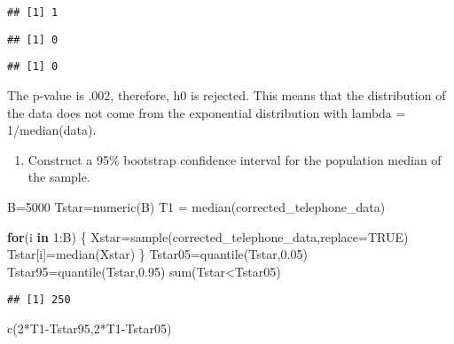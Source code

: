 \documentclass[
]{article}
\newenvironment{Shaded}{\begin{snugshade}}{\end{snugshade}}
\newcommand{\AttributeTok}[1]{\textcolor[rgb]{0.77,0.63,0.00}{#1}}
\newcommand{\ConstantTok}[1]{\textcolor[rgb]{0.00,0.00,0.00}{#1}}
\newcommand{\ControlFlowTok}[1]{\textcolor[rgb]{0.13,0.29,0.53}{\textbf{#1}}}
\newcommand{\DecValTok}[1]{\textcolor[rgb]{0.00,0.00,0.81}{#1}}
\newcommand{\FloatTok}[1]{\textcolor[rgb]{0.00,0.00,0.81}{#1}}
\newcommand{\FunctionTok}[1]{\textcolor[rgb]{0.00,0.00,0.00}{#1}}
\newcommand{\NormalTok}[1]{#1}
\newcommand{\OtherTok}[1]{\textcolor[rgb]{0.56,0.35,0.01}{#1}}
\newcommand{\SpecialCharTok}[1]{\textcolor[rgb]{0.00,0.00,0.00}{#1}}
\providecommand{\tightlist}{%
  \setlength{\itemsep}{0pt}\setlength{\parskip}{0pt}}
\begin{document}
\begin{verbatim}
## [1] 1
\end{verbatim}

\begin{verbatim}
## [1] 0
\end{verbatim}

\begin{verbatim}
## [1] 0
\end{verbatim}

The p-value is .002, therefore, h0 is rejected. This means that the
distribution of the data does not come from the exponential distribution
with lambda = 1/median(data).

\begin{enumerate}
\def\labelenumi{\alph{enumi})}
\setcounter{enumi}{2}
\tightlist
\item
  Construct a 95\% bootstrap confidence interval for the population
  median of the sample.
\end{enumerate}

\begin{Shaded}
\begin{Highlighting}[]
\NormalTok{B}\OtherTok{=}\DecValTok{5000}
\NormalTok{Tstar}\OtherTok{=}\FunctionTok{numeric}\NormalTok{(B)}
\NormalTok{T1 }\OtherTok{=} \FunctionTok{median}\NormalTok{(corrected\_telephone\_data)}

\ControlFlowTok{for}\NormalTok{(i }\ControlFlowTok{in} \DecValTok{1}\SpecialCharTok{:}\NormalTok{B) \{}
\NormalTok{  Xstar}\OtherTok{=}\FunctionTok{sample}\NormalTok{(corrected\_telephone\_data,}\AttributeTok{replace=}\ConstantTok{TRUE}\NormalTok{)}
\NormalTok{  Tstar[i]}\OtherTok{=}\FunctionTok{median}\NormalTok{(Xstar) \}}
\NormalTok{  Tstar05}\OtherTok{=}\FunctionTok{quantile}\NormalTok{(Tstar,}\FloatTok{0.05}\NormalTok{)}
\NormalTok{  Tstar95}\OtherTok{=}\FunctionTok{quantile}\NormalTok{(Tstar,}\FloatTok{0.95}\NormalTok{)}
  \FunctionTok{sum}\NormalTok{(Tstar}\SpecialCharTok{\textless{}}\NormalTok{Tstar05)}
\end{Highlighting}
\end{Shaded}

\begin{verbatim}
## [1] 250
\end{verbatim}

\begin{Shaded}
\begin{Highlighting}[]
\FunctionTok{c}\NormalTok{(}\DecValTok{2}\SpecialCharTok{*}\NormalTok{T1}\SpecialCharTok{{-}}\NormalTok{Tstar95,}\DecValTok{2}\SpecialCharTok{*}\NormalTok{T1}\SpecialCharTok{{-}}\NormalTok{Tstar05)}
\end{Highlighting}
\end{Shaded}
\end{document}
